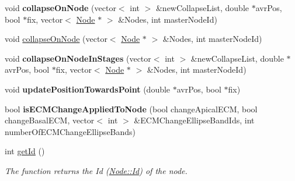 \begin{DoxyCompactItemize}
\item 
\hypertarget{classNode_ae584b51c8ad1943d93d43c6338b1172b}{}void {\bfseries collapse\+On\+Node} (vector$<$ int $>$ \&new\+Collapse\+List, double $\ast$avr\+Pos, bool $\ast$fix, vector$<$ \hyperlink{classNode}{Node} $\ast$ $>$ \&Nodes, int master\+Node\+Id)\label{classNode_ae584b51c8ad1943d93d43c6338b1172b}

\item 
void \hyperlink{classNode_a93882af02dfebc072718e557552ef2dc}{collapse\+On\+Node} (vector$<$ \hyperlink{classNode}{Node} $\ast$ $>$ \&Nodes, int master\+Node\+Id)
\item 
\hypertarget{classNode_afa1f19c0cccff374422d79387d18038e}{}void {\bfseries collapse\+On\+Node\+In\+Stages} (vector$<$ int $>$ \&new\+Collapse\+List, double $\ast$avr\+Pos, bool $\ast$fix, vector$<$ \hyperlink{classNode}{Node} $\ast$ $>$ \&Nodes, int master\+Node\+Id)\label{classNode_afa1f19c0cccff374422d79387d18038e}

\item 
\hypertarget{classNode_ae7e743eb067730a476ad2b8b27a6b137}{}void {\bfseries update\+Position\+Towards\+Point} (double $\ast$avr\+Pos, bool $\ast$fix)\label{classNode_ae7e743eb067730a476ad2b8b27a6b137}

\item 
\hypertarget{classNode_a3bbd413f099443fbffb1de65523f0bac}{}bool {\bfseries is\+E\+C\+M\+Change\+Applied\+To\+Node} (bool change\+Apical\+E\+C\+M, bool change\+Basal\+E\+C\+M, vector$<$ int $>$ \&E\+C\+M\+Change\+Ellipse\+Band\+Ids, int number\+Of\+E\+C\+M\+Change\+Ellipse\+Bands)\label{classNode_a3bbd413f099443fbffb1de65523f0bac}

\item 
int \hyperlink{classNode_a3c7b8ccf4dab44216b997c5f63f11d9f}{get\+Id} ()
\begin{DoxyCompactList}\small\item\em The function returns the Id (\hyperlink{classNode_a1bd379569cc1a8b96432e61971aed4d9}{Node\+::\+Id}) of the node. \end{DoxyCompactList}\end{DoxyCompactItemize}
